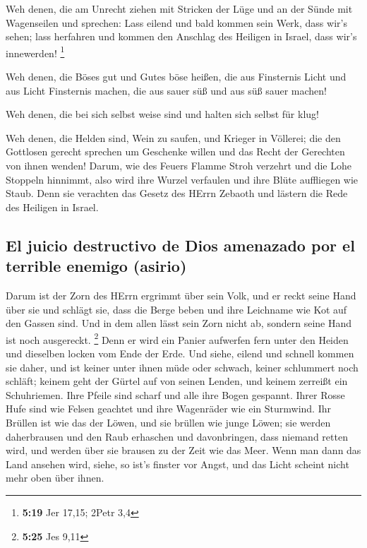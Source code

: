  Weh denen, die am Unrecht ziehen mit Stricken der Lüge
und an der Sünde mit Wagenseilen  und sprechen: Lass
eilend und bald kommen sein Werk, dass wir's sehen; lass herfahren und
kommen den Anschlag des Heiligen in Israel, dass wir's innewerden!
\footnote{\textbf{5:19} Jer 17,15; 2Petr 3,4}

 Weh denen, die Böses gut und Gutes böse heißen, die aus
Finsternis Licht und aus Licht Finsternis machen, die aus sauer süß und
aus süß sauer machen!

 Weh denen, die bei sich selbst weise sind und halten
sich selbst für klug!

 Weh denen, die Helden sind, Wein zu saufen, und Krieger
in Völlerei;  die den Gottlosen gerecht sprechen um
Geschenke willen und das Recht der Gerechten von ihnen wenden!
 Darum, wie des Feuers Flamme Stroh verzehrt und die Lohe
Stoppeln hinnimmt, also wird ihre Wurzel verfaulen und ihre Blüte
auffliegen wie Staub. Denn sie verachten das Gesetz des HErrn Zebaoth
und lästern die Rede des Heiligen in Israel.

\hypertarget{el-juicio-destructivo-de-dios-amenazado-por-el-terrible-enemigo-asirio}{%
\subsection{El juicio destructivo de Dios amenazado por el terrible
enemigo
(asirio)}\label{el-juicio-destructivo-de-dios-amenazado-por-el-terrible-enemigo-asirio}}

 Darum ist der Zorn des HErrn ergrimmt über sein Volk,
und er reckt seine Hand über sie und schlägt sie, dass die Berge beben
und ihre Leichname wie Kot auf den Gassen sind. Und in dem allen lässt
sein Zorn nicht ab, sondern seine Hand ist noch ausgereckt. \footnote{\textbf{5:25}
  Jes 9,11}  Denn er wird ein Panier aufwerfen fern unter
den Heiden und dieselben locken vom Ende der Erde. Und siehe, eilend und
schnell kommen sie daher,  und ist keiner unter ihnen
müde oder schwach, keiner schlummert noch schläft; keinem geht der
Gürtel auf von seinen Lenden, und keinem zerreißt ein Schuhriemen.
 Ihre Pfeile sind scharf und alle ihre Bogen gespannt.
Ihrer Rosse Hufe sind wie Felsen geachtet und ihre Wagenräder wie ein
Sturmwind.  Ihr Brüllen ist wie das der Löwen, und sie
brüllen wie junge Löwen; sie werden daherbrausen und den Raub erhaschen
und davonbringen, dass niemand retten wird,  und werden
über sie brausen zu der Zeit wie das Meer. Wenn man dann das Land
ansehen wird, siehe, so ist's finster vor Angst, und das Licht scheint
nicht mehr oben über ihnen.

